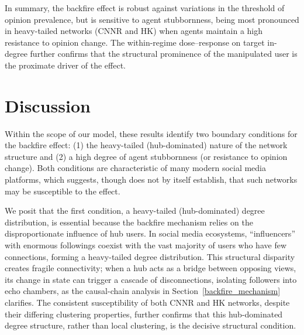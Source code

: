 \documentclass[pdflatex,sn-mathphys-num]{sn-jnl}%
\theoremstyle{thmstyleone}%
\theoremstyle{thmstyletwo}%
\theoremstyle{thmstylethree}%
\begin{document}
In summary, the backfire effect is robust against variations
in the threshold of opinion prevalence, but is sensitive to
agent stubbornness, being most pronounced in heavy-tailed
networks (CNNR and HK) when agents maintain a
high resistance to opinion change. The within-regime dose--response on target
in-degree further confirms that the structural prominence of the
manipulated user is the proximate driver of the effect.
\par


\section{Discussion}\label{Discussion}
Within the scope of our model, these results identify two
boundary conditions for the backfire effect:
(1) the heavy-tailed (hub-dominated) nature of
the network structure and (2) a high degree of agent stubbornness
(or resistance to opinion change).
Both conditions are characteristic of many modern social media
platforms, which suggests, though does not by itself establish, that
such networks may be susceptible to the effect.
\par

We posit that the first condition,
a heavy-tailed (hub-dominated) degree distribution,
is essential because the backfire mechanism relies
on the disproportionate influence of hub users.
In social media ecosystems, ``influencers'' with
enormous followings coexist with the vast majority
of users who have few connections, forming a
heavy-tailed degree distribution. This structural
disparity creates fragile connectivity;
when a hub acts as a bridge between opposing views,
its change in state can trigger a cascade of
disconnections, isolating followers into echo chambers, as the causal-chain
analysis in Section~\ref{backfire_mechanism} clarifies.
The consistent susceptibility of both CNNR and HK networks, despite their differing clustering properties,
further confirms that this hub-dominated
degree structure, rather than local clustering, is the decisive structural condition.
\par
\end{document}
